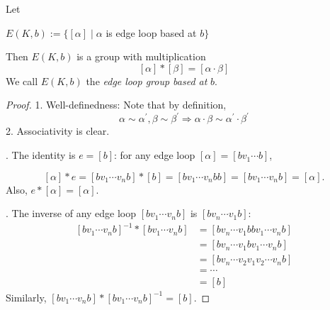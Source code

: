 \begin{proposition} Let 
\begin{center}
\(E\left( {K,b}\right):= \{ \left\lbrack  \alpha \right\rbrack   \mid  \alpha\) is edge loop based at \(b\}\) 
\end{center}
Then $E\left( {K,b}\right)$ is a group with multiplication
\[
\left\lbrack  \alpha \right\rbrack   * \left\lbrack  \beta \right\rbrack   = \left\lbrack  {\alpha  \cdot  \beta }\right\rbrack
\]
We call $E(K,b)$ the \emph{edge loop group based at} $b$.
\end{proposition}

\begin{proof}
1. Well-definedness: Note that by definition,
\[
\alpha  \sim  {\alpha }^{\prime },\beta  \sim  {\beta }^{\prime } \Rightarrow  \alpha  \cdot  \beta  \sim  {\alpha }^{\prime } \cdot  {\beta }^{\prime }
\]
2. Associativity is clear.

. The identity is \(e = \left\lbrack  b\right\rbrack\): for any edge loop \(\left\lbrack  \alpha \right\rbrack   = \left\lbrack  {b{v}_{1}\cdots b}\right\rbrack\),

\[
\left\lbrack  \alpha \right\rbrack   * e = \left\lbrack  {b{v}_{1}\cdots {v}_{n}b}\right\rbrack   * \left\lbrack  b\right\rbrack
= \left\lbrack  {b{v}_{1}\cdots {v}_{n}{bb}}\right\rbrack
= \left\lbrack  {b{v}_{1}\cdots {v}_{n}b}\right\rbrack   = \left\lbrack  \alpha \right\rbrack .\]
Also, \(e * \left\lbrack  \alpha \right\rbrack   = \left\lbrack  \alpha \right\rbrack\).

. The inverse of any edge loop \(\left\lbrack  {b{v}_{1}\cdots {v}_{n}b}\right\rbrack\) is \(\left\lbrack  {b{v}_{n}\cdots {v}_{1}b}\right\rbrack\):
\begin{align*}
{\left\lbrack  b{v}_{1}\cdots {v}_{n}b\right\rbrack  }^{-1} * \left\lbrack  {b{v}_{1}\cdots {v}_{n}b}\right\rbrack  &= \left\lbrack  {b{v}_{n}\cdots {v}_{1}{bb}{v}_{1}\cdots {v}_{n}b}\right\rbrack
\\
&= \left\lbrack  {b{v}_{n}\cdots {v}_{1}b{v}_{1}\cdots {v}_{n}b}\right\rbrack
\\
&= \left\lbrack  {b{v}_{n}\cdots {v}_{2}{v}_{1}{v}_{2}\cdots {v}_{n}b}\right\rbrack
\\
&= \cdots
\\
&= \left\lbrack  b\right\rbrack
\end{align*}
Similarly, \(\left\lbrack  {b{v}_{1}\cdots {v}_{n}b}\right\rbrack   * {\left\lbrack  b{v}_{1}\cdots {v}_{n}b\right\rbrack  }^{-1} = \left\lbrack  b\right\rbrack\).
\end{proof}

